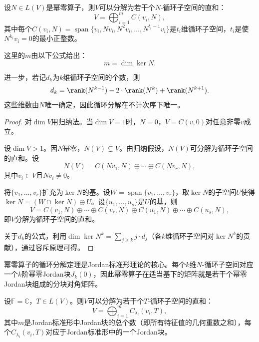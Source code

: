 \begin{theorem}[幂零算子的循环分解定理]
    设$N \in L(V)$是幂零算子，则$V$可以分解为若干个$N$-循环子空间的直和：
    \begin{equation}
        V = \bigoplus_{i=1}^m C(v_i, N),
    \end{equation}
    其中每个$C(v_i, N) = \operatorname{span}\{v_i, Nv_i, N^2v_i, \ldots, N^{t_i-1}v_i\}$是$t_i$维循环子空间，$t_i$是使$N^{k_i}v_i = 0$的最小正整数。

    这里的$m$由以下公式给出：
    \begin{equation}
        m=\dim\ker N.
    \end{equation}

    进一步，若记$d_k$为$k$维循环子空间的个数，则
    \begin{equation}
        d_k = \rank(N^{k-1}) - 2\cdot\rank(N^k) + \rank(N^{k+1}).
    \end{equation}
    这些维数由$N$唯一确定，因此循环分解在不计次序下唯一。
\end{theorem}

\begin{proof}
    对$\dim V$用归纳法。当$\dim V = 1$时，$N = 0$，$V = C(v, 0)$对任意非零$v$成立。

    设$\dim V > 1$。因$N$幂零，$N(V) \subsetneq V$。由归纳假设，$N(V)$可分解为循环子空间的直和。设
    \begin{equation}
        N(V) = C(Nv_1, N) \oplus \cdots \oplus C(Nv_r, N),
    \end{equation}
    其中$v_i \in V$且$Nv_i \neq 0$。

    将$\{v_1, \ldots, v_r\}$扩充为$\ker N$的基。设$W = \operatorname{span}\{v_1, \ldots, v_r\}$，取$\ker N$的子空间$U$使得$\ker N = (W \cap \ker N) \oplus U$。设$\{u_1, \ldots, u_s\}$是$U$的基，则
    \begin{equation}
        V = C(v_1, N) \oplus \cdots \oplus C(v_r, N) \oplus C(u_1, N) \oplus \cdots \oplus C(u_s, N),
    \end{equation}
    即$V$分解为循环子空间的直和。

    关于$d_k$的公式，利用$\dim \ker N^k = \sum_{j \geq k} j \cdot d_j$（各$k$维循环子空间对$\ker N^k$的贡献），通过容斥原理可得。
\end{proof}

幂零算子的循环分解定理是Jordan标准形理论的核心。每个$k$维$N$-循环子空间对应一个$k$阶幂零Jordan块$J_k(0)$，因此幂零算子在适当基下的矩阵就是若干个幂零Jordan块组成的分块对角矩阵。

\begin{theorem}[循环子空间分解]
    设$\mathbb{F} = \mathbb{C}$，$T \in L(V)$。则$V$可以分解为若干个$T$-循环子空间的直和：
    \begin{equation}
        V = \bigoplus_{i=1}^m C_{\lambda_i}(v_i, T),
    \end{equation}
    其中$m$是Jordan标准形中Jordan块的总个数（即所有特征值的几何重数之和），每个$C_{\lambda_i}(v_i, T)$对应于Jordan标准形中的一个Jordan块。
\end{theorem}

